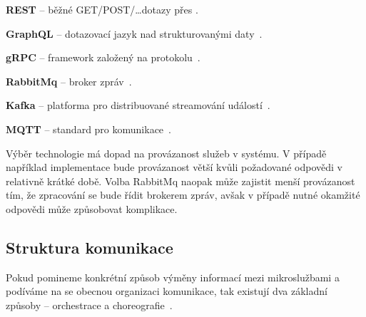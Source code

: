 \begin{ul}
   \item \textbf{REST} – běžné GET/POST/\ldots dotazy přes .
   \item \textbf{GraphQL} – dotazovací jazyk nad strukturovanými daty~\cite{graphql}.
   \item \textbf{gRPC} – framework založený na  protokolu~\cite{grpc}.
   \item \textbf{RabbitMq} – broker zpráv~\cite{rabbitmq}.
   \item \textbf{Kafka} – platforma pro distribuované streamování událostí~\cite{kafka}.
   \item \textbf{MQTT} – standard pro  komunikace~\cite{mqtt}.
\end{ul}

Výběr technologie má dopad na provázanost služeb v systému.
V případě například  implementace bude provázanost větší kvůli požadované odpovědi v relativně krátké době.
Volba RabbitMq naopak může zajistit menší provázanost tím, že zpracování se bude řídit brokerem zpráv, avšak v případě nutné okamžité odpovědi může způsobovat komplikace.



\subsection{Struktura komunikace}\label{subsec:msa-communication-structure}

Pokud pomineme konkrétní způsob výměny informací mezi mikroslužbami a podíváme na se obecnou organizaci komunikace, tak existují dva základní způsoby – orchestrace a choreografie~\cite{choreovsorch}.


